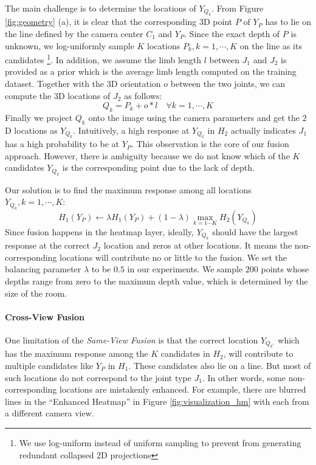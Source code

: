 \documentclass[10pt,twocolumn,letterpaper]{article}
\begin{document}
The main challenge is to determine the locations of ${Y}_{{Q}_k}$. From Figure \ref{fig:geometry} (a), it is clear that the corresponding $3$D point ${P}$ of ${Y}_{{P}}$ has to lie on the line defined by the camera center ${C}_1$ and ${Y}_{{P}}$. Since the exact depth of ${P}$ is unknown, we log-uniformly sample $K$ locations  ${P}_k, k=1,\cdots,K$ on the line as its candidates \footnote{We use log-uniform instead of uniform sampling to prevent from generating redundant collapsed $2$D projections}. In addition, we assume the limb length $l$ between ${J}_1$ and ${J}_2$ is provided as a prior which is the average limb length computed on the training dataset. Together with the $3$D orientation ${o}$ between the two joints, we can compute the $3$D locations of ${J}_2$ as follows:
\begin{equation}
 {Q}_k={P}_k + {o} * l \quad \forall k=1,\cdots,K   
\end{equation}
Finally we project ${Q}_k$ onto the image using the camera parameters and get the $2$D locations as ${Y}_{{Q}_k}$. Intuitively, a high response at ${Y}_{{Q}_k}$ in ${H}_2$ actually indicates ${J}_1$ has a high probability to be at ${Y}_{{P}}$. This observation is the core of our fusion approach. However, there is ambiguity because we do not know which of the $K$ candidates ${Y}_{{Q}_k}$ is the corresponding point due to the lack of depth. 



Our solution is to find the maximum response among all locations ${Y}_{{Q}_k},  k=1,\cdots,K$:
\begin{equation}
    {H}_1({Y}_{{P}}) \leftarrow \lambda {H}_1({Y}_{{P}}) + (1-\lambda) \max_{k=1 \cdots K}{{H}_2({Y}_{{Q}_k})}
\end{equation}
Since fusion happens in the heatmap layer, ideally, ${Y}_{{Q}_k}$ should have the largest response at the correct ${J}_2$ location and zeros at other locations. It means the non-corresponding locations will contribute no or little to the fusion. We set the balancing parameter $\lambda$ to be $0.5$ in our experiments. We sample $200$ points whose depths range from zero to the maximum depth value, which is determined by the size of the room.



\paragraph{Cross-View Fusion}
One limitation of the \emph{Same-View Fusion} is that the correct location ${Y}_{{Q}_{k^*}}$ which has the maximum response among the $K$ candidates in $H_2$, will contribute to multiple candidates like ${Y}_{{P}}$ in ${H}_1$. These candidates also lie on a line. But most of such locations do not correspond to the joint type ${J}_1$. In other words, some non-corresponding locations are mistakenly enhanced. For example, there are blurred lines in the ``Enhanced Heatmap'' in Figure \ref{fig:visualization_hm} with each from a different camera view.
\end{document}
